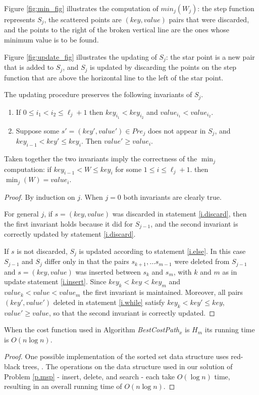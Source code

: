 Figure  \ref{fig:min_fig} illustrates the computation of $min_j(W_j)$: the step function represents 
$S_j$, the scattered points are $(key, value)$ pairs that were discarded, and the points to the right
of the broken vertical line are the ones whose minimum value is to be found.

Figure \ref{fig:update_fig} illustrates the updating of $S_j$: the star point is a new pair that is added
to $S_j$, and $S_j$ is updated by discarding the points on the step function that are above the horizontal line to the left  of the star point.

\begin{theorem}\label{p.kmu} The updating procedure preserves the following invariants of $S_j$.
  \begin{enumerate}
  	\item If $0\leq i_1< i_2 \leq \ell_j+1$ then $key_{i_1}< key_{i_2}$ and 
  	$value_{i_1} < value_{i_2}$.
  	\item Suppose some $s'=(key',value') \in Pre_j$ does not appear in $S_j$, and
  	$key_{i-1} < key' \leq key_i$. Then $value'\geq value_i$.
   \end{enumerate}
   Taken together the two invariants imply the correctness of the $\min_j$ computation: if $key_{i-1}<W\leq key_{i}$ for some $1\leq i \leq \ell_j+1$. then 
  	$\min_j(W)=value_{i}$.
\end{theorem}
\begin{proof}
By induction on $j$. When $j=0$ both invariants are clearly true.

For general $j$, if $s=(key,value)$ was discarded in statement \ref{i.discard}, then the first invariant holds because it did for $S_{j-1}$, and the second invariant is correctly updated
by statement \ref{i.discard}. 

If $s$ is not discarded, $S_j$ is updated according to statement \ref{i.else}. In this case $S_{j-1}$ and $S_j$ differ only in that 
the pairs $s_{k+1},\ldots s_{m-1}$ were deleted from $S_{j-1}$ and $s=(key,value)$ was
inserted between $s_k$ and $s_m$, with $k$ and $m$ as in
update statement \ref{i.insert}. Since $key_k<key <key_m$ and 
$value_k < value <value_m$ the first invariant is maintained.
Moreover, all pairs $(key',value')$
deleted in statement \ref{i.while}
satisfy $key_k<key'\leq key$, $value'\geq value$, so that the second invariant is correctly
updated.
\end{proof}
\begin{theorem}\label{t.linear-m}
	When the cost function used in Algorithm \emph{BestCostPath}$_x$ is $H_m$ its running time is $O(n\log n)$.
\end{theorem}
\begin{proof}
One possible implementation of the sorted set data structure uses red-black trees, \cite{guibas}.
The operations on the data structure used in our solution of Problem \ref{p.msp} -  insert, delete, and search - each take $O(\log n)$ time, resulting 
in an overall running time of $O(n \log n)$.
\end{proof}


